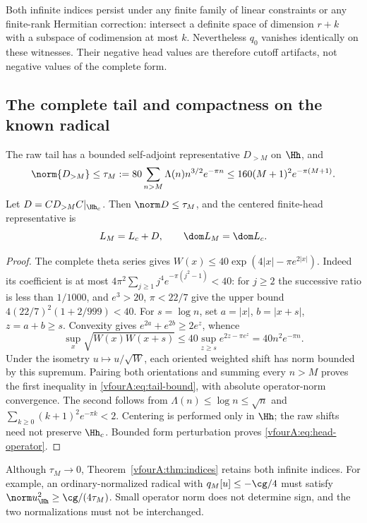 Both infinite indices persist under any finite family of linear
constraints or any finite-rank Hermitian correction: intersect a
definite space of dimension $r+k$ with a subspace of codimension at
most $k$.  Nevertheless $q_0$ vanishes identically on these witnesses.
Their negative head values are therefore cutoff artifacts, not
negative values of the complete form.

\subsection{The complete tail and compactness on the known radical}
\label{vfourA:subsec:compactness}

\begin{lemma}\label{vfourA:lem:tail}
The raw tail has a bounded self-adjoint representative $D_{>M}$ on
$\Hh$, and
\begin{equation}\label{vfourA:eq:tail-bound}
 \norm{D_{>M}}\le\tau_M
 :=80\sum_{n>M}\Lambda(n)n^{3/2}e^{-\pi n}
 \le160(M+1)^2e^{-\pi(M+1)}.
\end{equation}
Let $D=CD_{>M}C|_{\Hh_c}$.  Then $\norm D\le\tau_M$, and the centered
finite-head representative is
\begin{equation}\label{vfourA:eq:head-operator}
 L_M=L_c+D,\qquad \dom L_M=\dom L_c.
\end{equation}
\end{lemma}
\begin{proof}
The complete theta series gives
$W(x)\le40\exp(4|x|-\pi e^{2|x|})$.
Indeed its coefficient is at most
$4\pi^2\sum_{j\ge1}j^4e^{-\pi(j^2-1)}<40$:
for $j\ge2$ the successive ratio is less than $1/1000$, and
$e^3>20$, $\pi<22/7$ give the upper bound
$4(22/7)^2(1+2/999)<40$.
For $s=\log n$, set $a=|x|$, $b=|x+s|$, $z=a+b\ge s$.
Convexity gives $e^{2a}+e^{2b}\ge2e^z$, whence
\[
 \sup_x\sqrt{W(x)W(x+s)}
 \le40\sup_{z\ge s}e^{2z-\pi e^z}
 =40n^2e^{-\pi n}.
\]
Under the isometry $u\mapsto u/\sqrt W$, each oriented weighted
shift has norm bounded by this supremum.  Pairing both orientations
and summing every $n>M$ proves the first inequality in
\eqref{vfourA:eq:tail-bound}, with absolute operator-norm convergence.
The second follows from $\Lambda(n)\le\log n\le\sqrt n$ and
$\sum_{k\ge0}(k+1)^2e^{-\pi k}<2$.
Centering is performed only in $\Hh$; the raw shifts need not
preserve $\Hh_c$.  Bounded form perturbation proves
\eqref{vfourA:eq:head-operator}.
\end{proof}

Although $\tau_M\to0$, Theorem~\ref{vfourA:thm:indices} retains both
infinite indices.  For example, an ordinary-normalized radical with
$q_M[u]\le-\cg/4$ must satisfy
$\norm u_{\Hh}^2\ge\cg/(4\tau_M)$.  Small operator norm does not
determine sign, and the two normalizations must not be interchanged.

